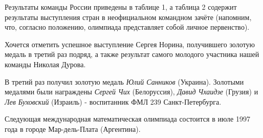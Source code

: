 \documentclass[a4paper,9pt]{article}
\begin{document}
\begin{multicols}{3}
Результаты команды России приведены в таблице 1, а таблица 2 содержит результаты выступления стран в неофициальном командном зачёте (напомним, что, согласно положению, олимпиада представляет собой личное первенство).

Хочется отметить успешное выступление Сергея Норина, получившего золотую медаль в третий раз подряд, а также результат самого молодого участника нашей команды Николая Дурова.

В третий раз получил золотую медаль \textit{Юлий Санников} (Украина). Золотыми медалями были награждены \textit{Сергей Чих} (Белоруссия), \textit{Давид Чхаидзе} (Грузия) и \textit{Лев Буховский} (Израиль) - воспитанник ФМЛ 239 Санкт-Петербурга.

Следующая международная математическая олимпиада состоится в июле 1997 года в городе Мар-дель-Плата (Аргентина).


\end{multicols}
\end{document}
